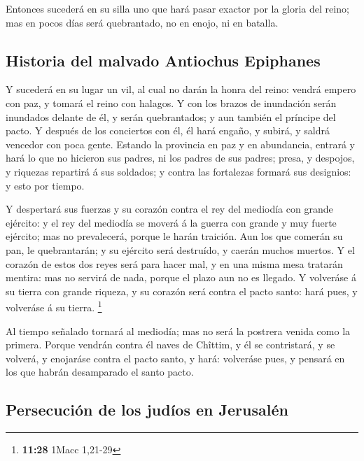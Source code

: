  Entonces sucederá en su silla uno que hará pasar exactor
por la gloria del reino; mas en pocos días será quebrantado, no en
enojo, ni en batalla.

\hypertarget{historia-del-malvado-antiochus-epiphanes}{%
\subsection{Historia del malvado Antiochus
Epiphanes}\label{historia-del-malvado-antiochus-epiphanes}}

 Y sucederá en su lugar un vil, al cual no darán la honra
del reino: vendrá empero con paz, y tomará el reino con halagos.
 Y con los brazos de inundación serán inundados delante de
él, y serán quebrantados; y aun también el príncipe del pacto.
 Y después de los conciertos con él, él hará engaño, y
subirá, y saldrá vencedor con poca gente.  Estando la
provincia en paz y en abundancia, entrará y hará lo que no hicieron sus
padres, ni los padres de sus padres; presa, y despojos, y riquezas
repartirá á sus soldados; y contra las fortalezas formará sus designios:
y esto por tiempo.

 Y despertará sus fuerzas y su corazón contra el rey del
mediodía con grande ejército: y el rey del mediodía se moverá á la
guerra con grande y muy fuerte ejército; mas no prevalecerá, porque le
harán traición.  Aun los que comerán su pan, le
quebrantarán; y su ejército será destruído, y caerán muchos muertos.
 Y el corazón de estos dos reyes será para hacer mal, y en
una misma mesa tratarán mentira: mas no servirá de nada, porque el plazo
aun no es llegado.  Y volveráse á su tierra con grande
riqueza, y su corazón será contra el pacto santo: hará pues, y volveráse
á su tierra. \footnote{\textbf{11:28} 1Macc 1,21-29}

 Al tiempo señalado tornará al mediodía; mas no será la
postrera venida como la primera.  Porque vendrán contra él
naves de Chîttim, y él se contristará, y se volverá, y enojaráse contra
el pacto santo, y hará: volveráse pues, y pensará en los que habrán
desamparado el santo pacto.

\hypertarget{persecuciuxf3n-de-los-juduxedos-en-jerusaluxe9n}{%
\subsection{Persecución de los judíos en
Jerusalén}\label{persecuciuxf3n-de-los-juduxedos-en-jerusaluxe9n}}

